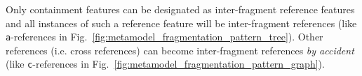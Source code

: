 Only containment features can be designated as inter-fragment reference features and all instances of such a reference feature will be inter-fragment references (like \texttt{a}-references in Fig.~\ref{fig:metamodel_fragmentation_pattern_tree}). Other references (i.e. cross references) can become inter-fragment references \emph{by accident} (like \texttt{c}-references in Fig.~\ref{fig:metamodel_fragmentation_pattern_graph}).


%
%
%
%
